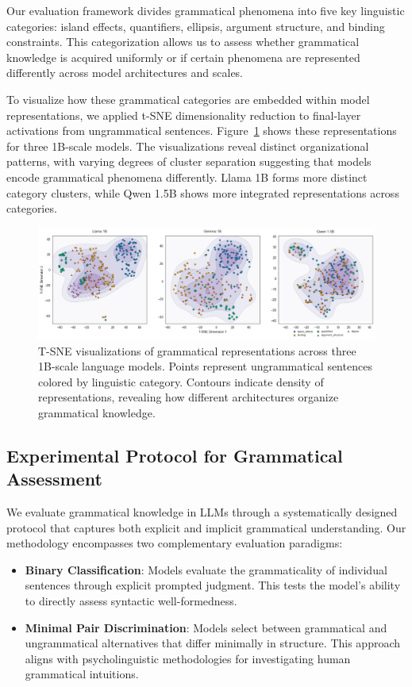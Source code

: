 \documentclass{article}
\begin{document}
Our evaluation framework divides grammatical phenomena into five key linguistic categories: island effects, quantifiers, ellipsis, argument structure, and binding constraints. This categorization allows us to assess whether grammatical knowledge is acquired uniformly or if certain phenomena are represented differently across model architectures and scales.

To visualize how these grammatical categories are embedded within model representations, we applied t-SNE 
dimensionality reduction to final-layer activations from ungrammatical sentences. 
Figure~\ref{fig:tsne} shows these representations for three 1B-scale models. The visualizations
 reveal distinct organizational patterns, with varying degrees of cluster separation suggesting that 
 models encode grammatical phenomena differently. Llama 1B forms more distinct category clusters, while 
 Qwen 1.5B shows more integrated representations across categories. 
\begin{figure}[t]
  \hspace*{-1cm}
  \includegraphics[width=1.1\textwidth]{figures/grammar_tsne}
  \caption{T-SNE visualizations of grammatical representations across three 1B-scale language models. Points represent ungrammatical sentences colored by linguistic category. Contours indicate density of representations, revealing how different architectures organize grammatical knowledge.}
  \label{fig:tsne}
\end{figure}

\subsection{Experimental Protocol for Grammatical Assessment}

We evaluate grammatical knowledge in LLMs through a systematically designed protocol that captures both explicit and implicit grammatical understanding. Our methodology encompasses two complementary evaluation paradigms:

\begin{itemize}
  \item \textbf{Binary Classification}: Models evaluate the grammaticality of individual sentences through explicit prompted judgment. This tests the model's ability to directly assess syntactic well-formedness.
  
  \item \textbf{Minimal Pair Discrimination}: Models select between grammatical and ungrammatical alternatives that differ minimally in structure. This approach aligns with psycholinguistic methodologies for investigating human grammatical intuitions.
\end{itemize}
\end{document}
